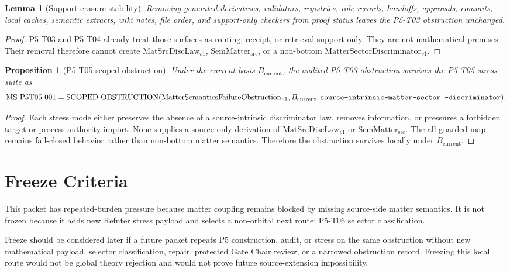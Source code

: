 \documentclass[11pt]{article}
\newcommand{\MatSrcDiscLaw}{\mathrm{MatSrcDiscLaw}_{v1}}
\newcommand{\SemMatterSrc}{\mathrm{SemMatter}_{\mathrm{src}}}
\newcommand{\MatterDisc}{\mathrm{MatterSectorDiscriminator}_{v1}}
\newcommand{\Obstruction}{\mathrm{MatterSemanticsFailureObstruction}_{v1}}
\newcommand{\Bcur}{B_{\mathrm{current}}}
\newcommand{\ScopedObstruction}{\mathrm{SCOPED\mbox{-}OBSTRUCTION}}
\newtheorem{lemma}{Lemma}
\newtheorem{proposition}{Proposition}
\begin{document}
\begin{lemma}[Support-erasure stability]
Removing generated derivatives, validators, registries, role records,
handoffs, approvals, commits, local caches, semantic extracts, wiki notes,
file order, and support-only checkers from proof status leaves the P5-T03
obstruction unchanged.
\end{lemma}

\begin{proof}
P5-T03 and P5-T04 already treat those surfaces as routing, receipt, or
retrieval support only. They are not mathematical premises. Their removal
therefore cannot create \(\MatSrcDiscLaw\), \(\SemMatterSrc\), or a non-bottom
\(\MatterDisc\).
\end{proof}

\begin{proposition}[P5-T05 scoped obstruction]
Under the current basis \(\Bcur\), the audited P5-T03 obstruction survives
the P5-T05 stress suite as
\[
  \mathrm{MS\mbox{-}P5T05\mbox{-}001}
  =
  \ScopedObstruction(\Obstruction,\Bcur,
  \texttt{source\mbox{-}intrinsic\mbox{-}matter\mbox{-}sector
  \mbox{-}discriminator}).
\]
\end{proposition}

\begin{proof}
Each stress mode either preserves the absence of a source-intrinsic
discriminator law, removes information, or pressures a forbidden target or
process-authority import. None supplies a source-only derivation of
\(\MatSrcDiscLaw\) or \(\SemMatterSrc\). The all-guarded map remains
fail-closed behavior rather than non-bottom matter semantics. Therefore the
obstruction survives locally under \(\Bcur\).
\end{proof}

\section{Freeze Criteria}

This packet has repeated-burden pressure because matter coupling remains
blocked by missing source-side matter semantics. It is not frozen because it
adds new Refuter stress payload and selects a non-orbital next route: P5-T06
selector classification.

Freeze should be considered later if a future packet repeats P5 construction,
audit, or stress on the same obstruction without new mathematical payload,
selector classification, repair, protected Gate Chair review, or a narrowed
obstruction record. Freezing this local route would not be global theory
rejection and would not prove future source-extension impossibility.
\end{document}
